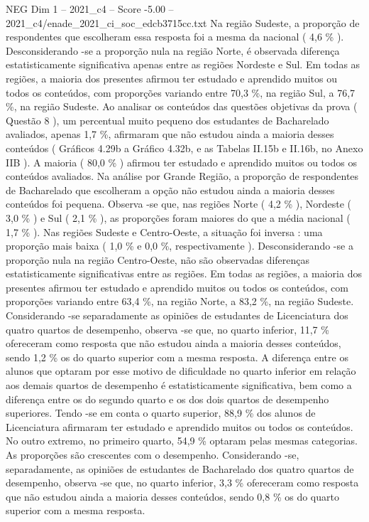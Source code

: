 \begin{textsample}{NEG Dim 1 – 2021\_c4 – Score -5.00 – 2021\_c4/enade\_2021\_ci\_soc\_edcb3715cc.txt}
Na região Sudeste, a proporção de respondentes que escolheram essa resposta foi a mesma da nacional ( 4,6 \% ).
Desconsiderando -se a proporção nula na região Norte, é observada diferença estatisticamente significativa apenas entre as regiões Nordeste e Sul.
Em todas as regiões, a maioria dos presentes afirmou ter estudado e aprendido muitos ou todos os conteúdos, com proporções variando entre 70,3 \%, na região Sul, a 76,7 \%, na região Sudeste.
Ao analisar os conteúdos das questões objetivas da prova ( Questão 8 ), um percentual muito pequeno dos estudantes de Bacharelado avaliados, apenas 1,7 \%, afirmaram que não estudou ainda a maioria desses conteúdos ( Gráficos 4.29b a Gráfico 4.32b, e as Tabelas II.15b e II.16b, no Anexo IIB ).
A maioria ( 80,0 \% ) afirmou ter estudado e aprendido muitos ou todos os conteúdos avaliados.
Na análise por Grande Região, a proporção de respondentes de Bacharelado que escolheram a opção não estudou ainda a maioria desses conteúdos foi pequena.
Observa -se que, nas regiões Norte ( 4,2 \% ), Nordeste ( 3,0 \% ) e Sul ( 2,1 \% ), as proporções foram maiores do que a média nacional ( 1,7 \% ).
Nas regiões Sudeste e Centro-Oeste, a situação foi inversa : uma proporção mais baixa ( 1,0 \% e 0,0 \%, respectivamente ).
Desconsiderando -se a proporção nula na região Centro-Oeste, não são observadas diferenças estatisticamente significativas entre as regiões.
Em todas as regiões, a maioria dos presentes afirmou ter estudado e aprendido muitos ou todos os conteúdos, com proporções variando entre 63,4 \%, na região Norte, a 83,2 \%, na região Sudeste.
Considerando -se separadamente as opiniões de estudantes de Licenciatura dos quatro quartos de desempenho, observa -se que, no quarto inferior, 11,7 \% ofereceram como resposta que não estudou ainda a maioria desses conteúdos, sendo 1,2 \% os do quarto superior com a mesma resposta.
A diferença entre os alunos que optaram por esse motivo de dificuldade no quarto inferior em relação aos demais quartos de desempenho é estatisticamente significativa, bem como a diferença entre os do segundo quarto e os dos dois quartos de desempenho superiores.
Tendo -se em conta o quarto superior, 88,9 \% dos alunos de Licenciatura afirmaram ter estudado e aprendido muitos ou todos os conteúdos.
No outro extremo, no primeiro quarto, 54,9 \% optaram pelas mesmas categorias.
As proporções são crescentes com o desempenho.
Considerando -se, separadamente, as opiniões de estudantes de Bacharelado dos quatro quartos de desempenho, observa -se que, no quarto inferior, 3,3 \% ofereceram como resposta que não estudou ainda a maioria desses conteúdos, sendo 0,8 \% os do quarto superior com a mesma resposta.

\end{textsample}
